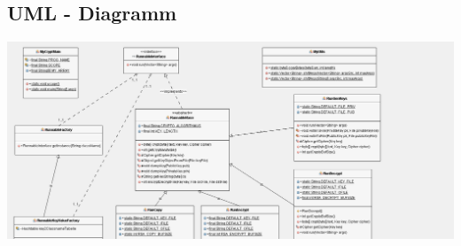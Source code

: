 \subsection{UML - Diagramm}
\begin{center}
	\includegraphics[width=1\textwidth]{./img/UML}
\end{center}